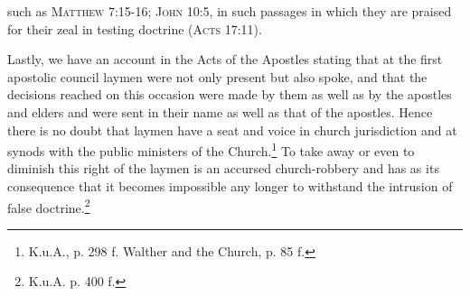 such as {\scriptsize\textsc{Matthew 7:15-16; John 10:5}}, in such passages in which they are praised for their zeal in testing doctrine {\scriptsize\textsc{(Acts 17:11)}}.  \par Lastly, we have an account in the Acts of the Apostles stating that at the first apostolic council laymen were not only present but also spoke, and that the decisions reached on this occasion were made by them as well as by the apostles and elders and were sent in their name as well as that of the apostles.  Hence there is no doubt that laymen have a seat and voice in church jurisdiction and at synods with the public ministers of the Church.\footnote{K.u.A., p. 298 f. Walther and the Church, p. 85 f.} To take away or even to diminish this right of the laymen is an accursed church-robbery and has as its consequence that it becomes impossible any longer to withstand the intrusion of false doctrine.\footnote{K.u.A. p. 400 f.}

